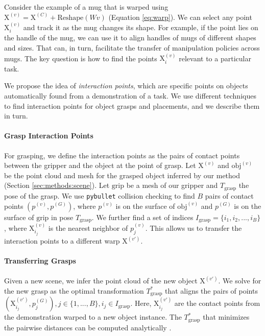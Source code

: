 \documentclass{article}
\newcommand{\pcx}[1]{\mathrm{X}^{(#1)}}
\newcommand{\pcc}{\pcx{C}}
\begin{document}

Consider the example of a mug that is warped using $\pcx{v} = \pcc + \mathrm{Reshape}(W v)$ (Equation \ref{eq:warp}). We can select any point $\pcx{v}_i$ and track it as the mug changes its shape. For example, if the point lies on the handle of the mug, we can use it to align handles of mugs of different shapes and sizes. That can, in turn, facilitate the transfer of manipulation policies across mugs. The key question is how to find the points $\pcx{v}_i$ relevant to a particular task.

We propose the idea of \textit{interaction points}, which are specific points on objects automatically found from a demonstration of a task. We use different techniques to find interaction points for object grasps and placements, and we describe them in turn.

\paragraph{Grasp Interaction Points} For grasping, we define the interaction points as the pairs of contact points between the gripper and the object at the point of grasp. Let $\pcx{v}$ and $\mathrm{obj}^{(v)}$ be the point cloud and mesh for the grasped object inferred by our method (Section \ref{sec:methods:scene}). Let $\mathrm{grip}$ be a mesh of our gripper and $T_{\mathrm{grasp}}$ the pose of the grasp. We use \texttt{pybullet} collision checking to find $B$ pairs of contact points $ (p^{(v)}, p^{(G)})$, where $p^{(v)}$ is on the surface of $\mathrm{obj}^{(v)}$ and $p^{(G)}$ is on the surface of $\mathrm{grip}$ in pose $T_{\mathrm{grasp}}$. We further find a set of indices $I_{\mathrm{grasp}} = \{i_1, i_2, ..., i_B\}$, where $\pcx{v}_{i_j}$ is the nearest neighbor of $p^{(v)}_j$. This allows us to transfer the interaction points to a different warp $\pcx{v'}$.

\paragraph{Transferring Grasps} Given a new scene, we infer the point cloud of the new object $\pcx{v'}$. We solve for the new grasp as the optimal transformation $T_{\mathrm{grasp}}^*$ that aligns the pairs of points $(\pcx{v'}_{i_j}, p^{(G)}_j), j \in \{1, ..., B\}, i_j \in I_{\mathrm{grasp}}$. Here, $\pcx{v'}_{i_j}$ are the contact points from the demonstration warped to a new object instance. The $T_{\mathrm{grasp}}^*$ that minimizes the pairwise distances can be computed analytically \cite{horn88computation}.
\end{document}
